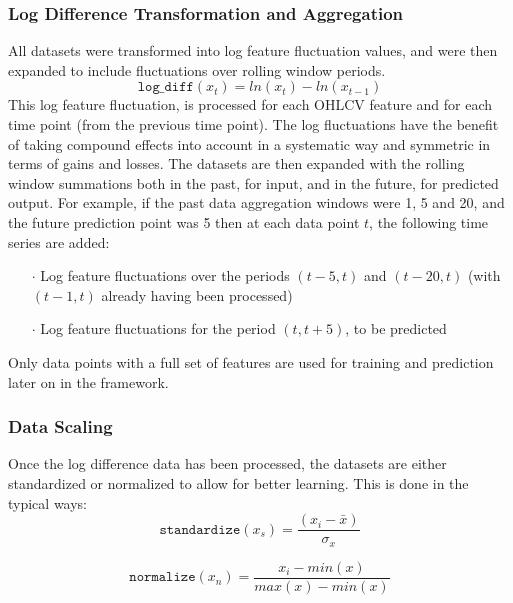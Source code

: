 \documentclass[a4paper,latin]{paper}
\begin{document}
\subsubsection{Log Difference Transformation and Aggregation}\label{ldata_og_difference}
All datasets were transformed into log feature fluctuation values, and were then expanded to include fluctuations over rolling window periods.
\begin{equation}
\texttt{log\_diff}(x_t) = ln(x_t) - ln(x_{t-1})
\end{equation}
This log feature fluctuation,  is processed for each OHLCV feature and for each time point (from the previous time point). The log fluctuations have the benefit of taking compound effects into account in a systematic way and symmetric in terms of gains and losses.
\newline\newline
The datasets are then expanded with the rolling window summations both in the past, for input, and in the future, for predicted output. For example, if the past data aggregation windows were 1, 5 and 20, and the future prediction point was 5 then at each data point $t$, the following time series are added:
\begin{itemize}
	\item [$\cdot$] Log feature fluctuations over the periods $(t-5, t)$ and $(t-20, t)$ (with $(t-1, t)$ already having been processed)
	\item [$\cdot$] Log feature fluctuations for the period $(t, t + 5)$, to be predicted
\end{itemize}

Only data points with a full set of features are used for training and prediction later on in the framework.

\subsubsection{Data Scaling}\label{data_scaling}
Once the log difference data has been processed, the datasets are either standardized or normalized to allow for better learning. This is done in the typical ways:
\begin{equation}
\texttt{standardize}(x_s) = \frac{(x_i - \bar{x}) }{\sigma_x}
\end{equation}

\begin{equation}
\texttt{normalize}(x_n) = \frac{x_i - min(x) }{max(x) - min(x)}
\end{equation}
\end{document}
